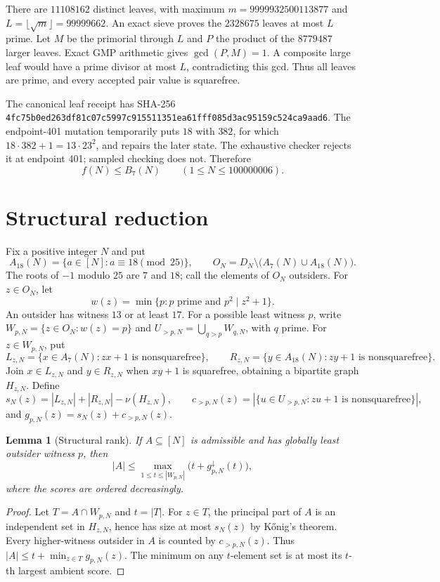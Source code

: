 \documentclass[11pt]{article}
\newtheorem{lemma}{Lemma}
\newcommand{\Bseven}{B_7}
\newcommand{\sha}[1]{\texttt{\nolinkurl{#1}}}
\begin{document}
There are $11108162$ distinct leaves, with maximum
$m=9999932500113877$ and $L=\lfloor\sqrt m\rfloor=99999662$.
An exact sieve proves the $2328675$ leaves at most $L$ prime.  Let $M$ be
the primorial through $L$ and $P$ the product of the $8779487$ larger
leaves.  Exact GMP arithmetic gives $\gcd(P,M)=1$.  A composite large leaf
would have a prime divisor at most $L$, contradicting this gcd.  Thus all
leaves are prime, and every accepted pair value is squarefree.

The canonical leaf receipt has SHA-256
\sha{4fc75b0ed263df81c07c5997c915511351ea61fff085d3ac95159c524ca9aad6}.
The endpoint-401 mutation temporarily puts $18$ with $382$, for which
$18\cdot382+1=13\cdot23^2$, and repairs the later state.  The exhaustive
checker rejects it at endpoint 401; sampled checking does not.  Therefore
\[
f(N)\le\Bseven(N)\qquad(1\le N\le100000006).
\]

\section{Structural reduction}

Fix a positive integer $N$ and put
\[
 A_{18}(N)=\{a\in[N]:a\equiv18\pmod{25}\},\qquad
 O_N=D_N\setminus\bigl(A_7(N)\cup A_{18}(N)\bigr).
\]
The roots of $-1$ modulo $25$ are $7$ and $18$; call the elements of $O_N$
outsiders.  For $z\in O_N$, let
\[
 w(z)=\min\{p:p\text{ prime and }p^2\mid z^2+1\}.
\]
An outsider has witness $13$ or at least $17$.  For a possible least
witness $p$, write $W_{p,N}=\{z\in O_N:w(z)=p\}$ and
$U_{>p,N}=\bigcup_{q>p}W_{q,N}$, with $q$ prime.  For $z\in W_{p,N}$, put
\[
 L_{z,N}=\{x\in A_7(N):zx+1\text{ is nonsquarefree}\},\qquad
 R_{z,N}=\{y\in A_{18}(N):zy+1\text{ is nonsquarefree}\}.
\]
Join $x\in L_{z,N}$ and $y\in R_{z,N}$ when $xy+1$ is squarefree,
obtaining a bipartite graph $H_{z,N}$.  Define
\[
 s_N(z)=|L_{z,N}|+|R_{z,N}|-\nu(H_{z,N}),\qquad
 c_{>p,N}(z)=|\{u\in U_{>p,N}:zu+1\text{ is nonsquarefree}\}|,
\]
and $g_{p,N}(z)=s_N(z)+c_{>p,N}(z)$.

\begin{lemma}[Structural rank]
If $A\subseteq[N]$ is admissible and has globally least outsider witness $p$,
then
\[
 |A|\le\max_{1\le t\le|W_{p,N}|}
       \bigl(t+g_{p,N}^\downarrow(t)\bigr),
\]
where the scores are ordered decreasingly.
\end{lemma}

\begin{proof}
Let $T=A\cap W_{p,N}$ and $t=|T|$.  For $z\in T$, the principal part of
$A$ is an independent set in $H_{z,N}$, hence has size at most $s_N(z)$ by
K\H{o}nig's theorem.  Every higher-witness outsider in $A$ is counted by
$c_{>p,N}(z)$.  Thus
$|A|\le t+\min_{z\in T}g_{p,N}(z)$.  The minimum on any $t$-element set is
at most its $t$-th largest ambient score.
\end{proof}
\end{document}
